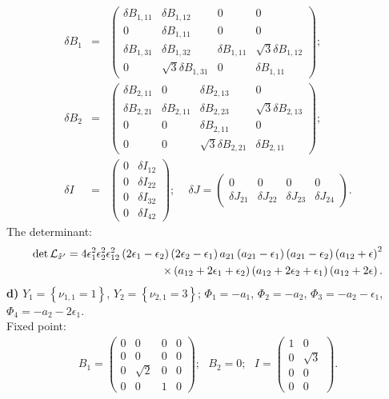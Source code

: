 \documentclass[a4paper,12pt]{article}
\begin{document}
\begin{eqnarray}
\delta B_1 &=& \left(\begin{array}{cccc} \delta B_{1,11} & \delta B_{1,12} & 0 & 0 \\
0 & \delta B_{1,11} & 0 & 0 \\ \delta B_{1,31} & \delta B_{1,32} & \delta B_{1,11} & \sqrt{3}\delta B_{1,12}
\\ 0 & \sqrt{3} \delta B_{1,31} & 0 & \delta B_{1,11}
\end{array}\right); \nonumber \\
\delta B_2 &=& \left(\begin{array}{cccc} \delta B_{2,11} & 0 & \delta B_{2,13} & 0 \\ \delta B_{2,21} & \delta B_{2,11} & \delta B_{2,23} & \sqrt{3} \delta B_{2,13} \\
0 & 0 & \delta B_{2,11} & 0 \\
0 & 0 & \sqrt{3} \delta B_{2,21} & \delta B_{2,11}
\end{array}\right); \nonumber \\
\delta I &=& \left(\begin{array}{cc} 0 & \delta I_{12} \\ 0 & \delta I_{22} \\ 0 & \delta I_{32} \\ 0 & \delta
I_{42}
\end{array}\right); \, \, \, \, \, \, \,
\delta J=\left(\begin{array}{cccc} 0 & 0 & 0 & 0 \\ \delta J_{21} & \delta J_{22} & \delta J_{23} & \delta
J_{24}
\end{array}\right).
\end{eqnarray}
The determinant:
\begin{eqnarray}
\det {\cal L}_{{\tilde x}'}=4 \epsilon_1^2 \epsilon_2^2
\epsilon_{12}^2 \left(2 \epsilon_1 -\epsilon_2 \right)\left(2
\epsilon_2 -\epsilon_1 \right)a_{21} \left(a_{21}-\epsilon_1
\right) \left(a_{21}-\epsilon_2
\right)\left(a_{12}+\epsilon \right)^2 \nonumber \\
\times \left(a_{12}+2\epsilon_1 +\epsilon_2 \right)\left(a_{12}+2\epsilon_2 +\epsilon_1
\right)\left(a_{12}+2\epsilon \right).
\end{eqnarray}
{\bf d)} $Y_1=\left\{\nu_{1,1}=1 \right\}$,
$Y_2=\left\{\nu_{2,1}=3 \right\}$; $\Phi_1=-a_1$, $\Phi_2=-a_2$,
$\Phi_3=-a_2-\epsilon_1$, $\Phi_4=-a_2-2\epsilon_1$. \\
Fixed point:
\begin{eqnarray}
B_1=\left(\begin{array}{cccc} 0 & 0 & 0 & 0 \\ 0 & 0 & 0 & 0 \\ 0 & \sqrt{2} & 0 & 0 \\
0 & 0 & 1 & 0
\end{array}\right); \, \, \, \, B_2=0;
 \, \, \, \, I=\left(\begin{array}{cc} 1 & 0 \\ 0 & \sqrt{3} \\0 & 0 \\ 0 & 0
\end{array}\right).
\end{eqnarray}
\end{document}
